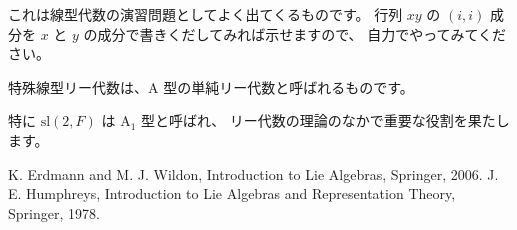 \documentclass{ltjsarticle}
\begin{document}
これは線型代数の演習問題としてよく出てくるものです。
行列 \(xy\) の \((i,i)\) 成分を \(x\) と \(y\) の成分で書きくだしてみれば示せますので、
自力でやってみてください。

特殊線型リー代数は、\(\mathrm{A}\) 型の単純リー代数と呼ばれるものです。

特に \(\mathrm{sl}(2,F)\) は \(\mathrm{A}_1\) 型と呼ばれ、
リー代数の理論のなかで重要な役割を果たします。

\begin{thebibliography}{9}
     K. Erdmann and M. J. Wildon, Introduction to Lie Algebras, Springer, 2006.
     J. E. Humphreys, Introduction to Lie Algebras and Representation Theory, Springer, 1978.
\end{thebibliography}
\end{document}
